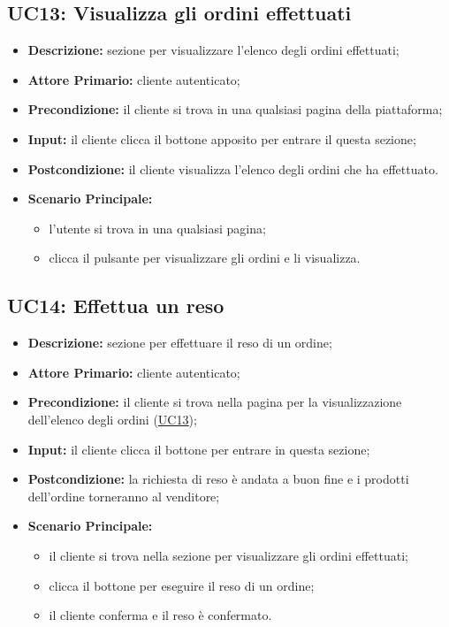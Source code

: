         \subsection{UC13: Visualizza gli ordini effettuati}
        \label{sec:UC13}
        \begin{itemize}
            \item \textbf{Descrizione:} sezione per visualizzare l'elenco degli ordini effettuati;
            \item \textbf{Attore Primario:} cliente autenticato;
            \item \textbf{Precondizione:} il cliente si trova in una qualsiasi pagina della piattaforma;
            \item \textbf{Input:} il cliente clicca il bottone apposito per entrare il questa sezione;
            \item \textbf{Postcondizione:} il cliente visualizza l'elenco degli ordini che ha effettuato.
            \item \textbf{Scenario Principale:}
            \begin{itemize}
                \item l'utente si trova in una qualsiasi pagina;
                \item clicca il pulsante per visualizzare gli ordini e li visualizza.
            \end{itemize}
        \end{itemize}


        \subsection{UC14: Effettua un reso}
        \begin{itemize}
            \item \textbf{Descrizione:} sezione per effettuare il reso di un ordine;
            \item \textbf{Attore Primario:} cliente autenticato;
            \item \textbf{Precondizione:} il cliente si trova nella pagina per la visualizzazione dell'elenco degli ordini (\hyperref[sec:UC13]{\underline{UC13}});
            \item \textbf{Input:} il cliente clicca il bottone per entrare in questa sezione;
            \item \textbf{Postcondizione:} la richiesta di reso è andata a buon fine e i prodotti dell'ordine torneranno al venditore;
            \item \textbf{Scenario Principale:}
                \begin{itemize}
                    \item il cliente si trova nella sezione per visualizzare gli ordini effettuati;
                    \item clicca il bottone per eseguire il reso di un ordine;
                    \item il cliente conferma e il reso è confermato.
                \end{itemize}
        \end{itemize}


